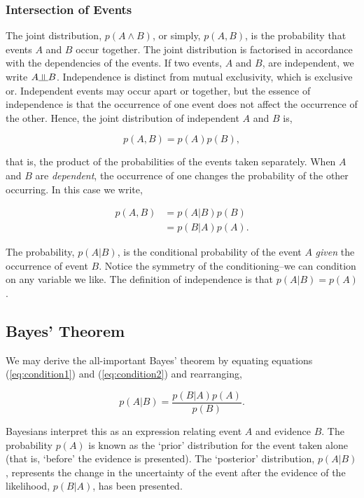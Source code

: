 \documentclass[11pt]{amsart}
\newcommand{\indep}{\rotatebox[origin=c]{90}{$\models$}}
\begin{document}
\subsubsection{Intersection of Events}

The joint distribution, $p(A \land B)$, or simply, $p(A, B)$, is the probability that events $A$ and $B$ occur together. The joint distribution is factorised in accordance with the dependencies of the events. If two events, $A$ and $B$, are independent, we write $A \indep B$. Independence is distinct from mutual exclusivity, which is exclusive or. Independent events may occur apart or together, but the essence of independence is that the occurrence of one event does not affect the occurrence of the other. Hence, the joint distribution of independent $A$ and $B$ is,

$$p(A, B) = p(A)p(B),$$

that is, the product of the probabilities of the events taken separately. When $A$ and $B$ are \emph{dependent}, the occurrence of one changes the probability of the other occurring. In this case we write,

\begin{align}
p(A, B) &= p(A|B)p(B) \label{eq:condition1} \\
&= p(B|A)p(A). \label{eq:condition2}
\end{align}

The probability, $p(A|B)$, is the conditional probability of the event $A$ \emph{given} the occurrence of event $B$. Notice the symmetry of the conditioning--we can condition on any variable we like. The definition of independence is that $p(A|B) = p(A)$.

\subsection{Bayes' Theorem}

We may derive the all-important Bayes' theorem by equating equations (\ref{eq:condition1}) and (\ref{eq:condition2}) and rearranging,

$$p(A | B) = \frac{p(B | A)p(A)}{p(B)}.$$

Bayesians interpret this as an expression relating event $A$ and evidence $B$. The probability $p(A)$ is known as the `prior' distribution for the event taken alone (that is, `before' the evidence is presented). The `posterior' distribution, $p(A | B)$, represents the change in the uncertainty of the event after the evidence of the likelihood, $p(B | A)$, has been presented.
\end{document}
